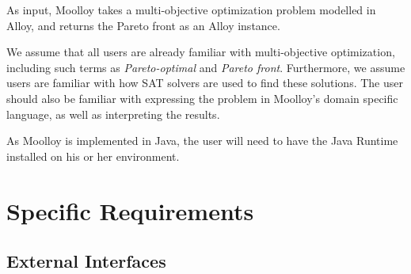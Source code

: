 \documentclass[11pt]{article}
\theoremstyle{definition}
\begin{document}

As input, Moolloy takes a multi-objective optimization problem modelled
in Alloy, and returns the Pareto front as an Alloy instance.


We assume that all users are already familiar with multi-objective
optimization, including such terms as \textit{Pareto-optimal} and
\textit{Pareto front}. Furthermore, we assume users are familiar with
how SAT solvers are used to find these solutions. The user should also
be familiar with expressing the problem in Moolloy's domain specific
language, as well as interpreting the results.



As Moolloy is implemented in Java, the user will need to have the Java
Runtime installed on his or her environment.

\section{Specific Requirements}\label{sec:specific_reqs}

\subsection{External Interfaces}\label{sec:ext_int}
\end{document}
